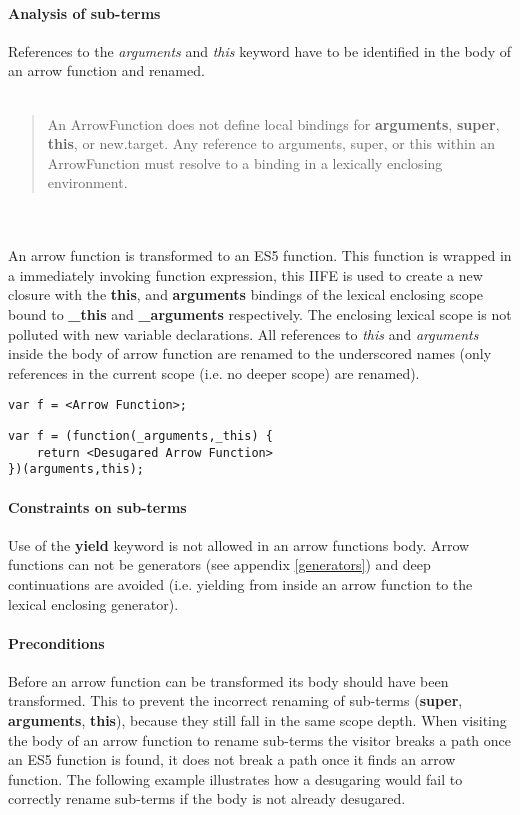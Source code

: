 \paragraph{Analysis of sub-terms}
References to the \textit{arguments} and \textit{this} keyword have to be identified in the body of an arrow function and renamed.
\\
\\
\blockquote[{\cite[14.2.16]{SpecJS}}]{An ArrowFunction does not define local bindings for \textbf{arguments}, \textbf{super}, \textbf{this}, or new.target. Any reference to arguments, super, or this within an ArrowFunction must resolve to a binding in a lexically enclosing environment.}
\\\\
An arrow function is transformed to an ES5 function. This function is wrapped in a immediately invoking function expression, this IIFE is used to create a new closure with the \textbf{this}, and \textbf{arguments} bindings of the lexical enclosing scope bound to \textbf{\_this} and \textbf{\_arguments} respectively. The enclosing lexical scope is not polluted with new variable declarations. All references to \textit{this} and \textit{arguments} inside the body of arrow function are renamed to the underscored names (only references in the current scope (i.e. no deeper scope) are renamed).

\begin{lstlisting}
var f = <Arrow Function>;
\end{lstlisting}

\begin{lstlisting}
var f = (function(_arguments,_this) {
	return <Desugared Arrow Function>
})(arguments,this);
\end{lstlisting}

\paragraph{Constraints on sub-terms}
Use of the \textbf{yield} keyword is not allowed in an arrow functions body. Arrow functions can not be generators (see appendix \ref{generators}) and deep continuations are avoided (i.e. yielding from inside an arrow function to the lexical enclosing generator).

\paragraph{Preconditions}
Before an arrow function can be transformed its body should have been transformed. This to prevent the incorrect renaming of sub-terms (\textbf{super}, \textbf{arguments}, \textbf{this}), because they still fall in the same scope depth. When visiting the body of an arrow function to rename sub-terms the visitor breaks a path once an ES5 function is found, it does not break a path once it finds an arrow function. The following example illustrates how a desugaring would fail to correctly rename sub-terms if the body is not already desugared.

